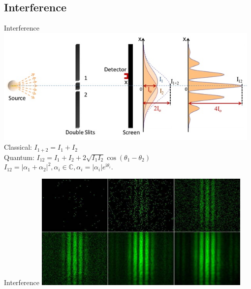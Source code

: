 \subsection{Interference}
\begin{frame}{Interference}
    \includegraphics[width=0.98\textwidth]{pics/ds_exp.jpg}\\
    Classical: $I_{1+2}=I_1 + I_2$\\
    Quantum: $I_{12}=I_1 + I_2 + 2\sqrt{I_1 I_2} \cos(\theta_1 - \theta_2)$\\
    $I_{12}=|\alpha_1+\alpha_2|^2, \alpha_i \in \mathbb{C}, \alpha_i=|\alpha_i|e^{\mathrm{i}\theta_i}.$
\end{frame}
\begin{frame}{Interference}
    \centering
    \includegraphics[width=0.8\textwidth]{pics/ds_pattern.jpg}
\end{frame}
